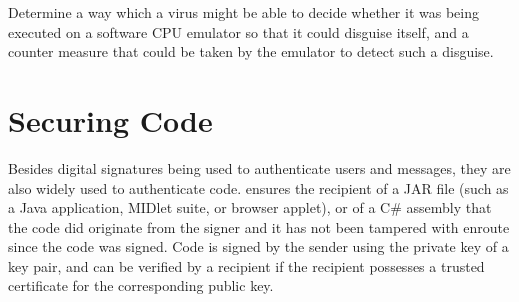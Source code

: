 \begin{exercise}
Determine a way which a virus might be able to decide whether it was being executed
on a software CPU emulator so that it could disguise itself, and a counter measure that
could be taken by the emulator to detect such a disguise.
\end{exercise}



\section{Securing Code}\label{Se:SecuringCode}
Besides digital signatures being used to authenticate users and messages, they are
also widely used to authenticate code.  ensures the
recipient of a JAR file (such as a Java application, MIDlet suite, or browser applet),
or of a C\# assembly that the code did originate from the signer
and it has not been tampered with enroute since the code was signed.
Code is signed by the sender using the private key of a key pair, and can be verified
by a recipient if the recipient possesses a trusted certificate for the corresponding public key.

